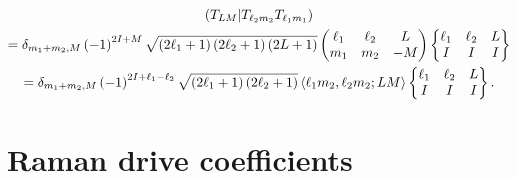 \documentclass[nofootinbib,notitlepage,11pt]{revtex4-2}
\newcommand{\p}[1]{\left(#1\right)} %
\newcommand{\bk}{\Braket} %
\newcommand{\1}{\mathds{1}}
\def\obk#1{\mathinner{({#1})}}
\begin{document}
\begin{multline}
  \obk{T_{LM} | T_{\ell_2 m_2} T_{\ell_1 m_1}} \\
  = \delta_{m_1+m_2,M} \p{-1}^{2I+M}
  \sqrt{\p{2\ell_1+1}\p{2\ell_2+1}\p{2L+1}}
  \begin{pmatrix}
    \ell_1 & \ell_2 & L \\
    m_1 & m_2 & -M
  \end{pmatrix}
  \begin{Bmatrix}
    \ell_1 & \ell_2 & L \\
    I & I & I
  \end{Bmatrix} \\
  = \delta_{m_1+m_2,M} \p{-1}^{2I+\ell_1-\ell_2}
  \sqrt{\p{2\ell_1+1}\p{2\ell_2+1}}
  \bk{\ell_1 m_2, \ell_2 m_2; LM}
  \begin{Bmatrix}
    \ell_1 & \ell_2 & L \\
    I & I & I
  \end{Bmatrix}.
\end{multline}

\section{Raman drive coefficients}
\label{sec:drive_raman_coeff}
\end{document}
